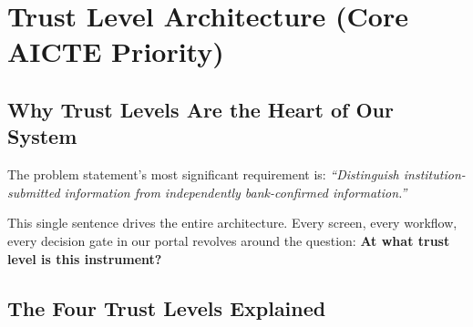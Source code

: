 \documentclass[12pt, a4paper]{report}
\begin{document}
\chapter{Trust Level Architecture (Core AICTE Priority)}

\section{Why Trust Levels Are the Heart of Our System}

\begin{connectionbox}
The problem statement's most significant requirement is: \textit{``Distinguish institution-submitted information from independently bank-confirmed information.''}

This single sentence drives the entire architecture. Every screen, every workflow, every decision gate in our portal revolves around the question: \textbf{At what trust level is this instrument?}
\end{connectionbox}

\section{The Four Trust Levels Explained}
\end{document}
